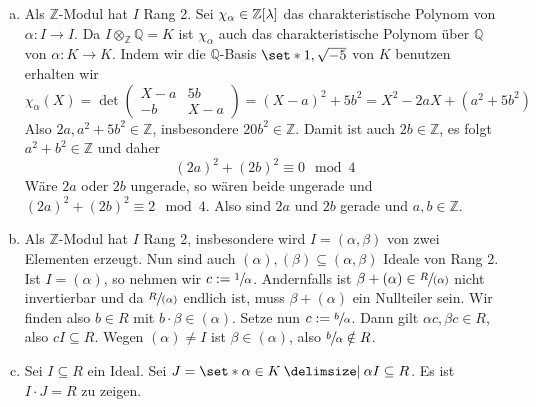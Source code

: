 \begin{beweis}
    \begin{enumerate}[a)]
        \item Als $\mathbb{Z}$-Modul hat $I$ Rang 2.
        Sei $\chi_\alpha \in \mathbb{Z} \benbrace*{\lambda}$ das charakteristische Polynom von $\alpha \colon I \to I$.
        Da $I \otimes_{\mathbb{Z}} \mathbb{Q} = K$ ist $\chi_\alpha$ auch das charakteristische Polynom über $\mathbb{Q}$ von $\alpha \colon K \to K$.
        Indem wir die $\mathbb{Q}$-Basis $\set*{1, \sqrt{-5}}$ von $K$ benutzen erhalten wir 
        \[
            \chi_\alpha(X) = \det \begin{pmatrix}
                X- a & 5b\\
                -b & X-a
            \end{pmatrix} = (X-a)^2 + 5 b^2 = X^2 -2 a X + (a^2 + 5b^2)
        \]
        Also $2a, a^2 + 5b^2 \in \mathbb{Z}$, insbesondere $20b^2 \in \mathbb{Z}$.
        Damit ist auch $2 b \in \mathbb{Z}$, es folgt $a^2 +b^2 \in \mathbb{Z}$ und daher
        \[
            (2a)^2 + (2b)^2 \equiv 0 \mod 4
        \]
        Wäre $2 a$ oder $2b$ ungerade, so wären beide ungerade und $(2a)^2 + (2b)^2 \equiv 2 \mod 4$.
        Also sind $2a$ und $2b$ gerade und $a,b \in \mathbb{Z}$.
        \item Als $\mathbb{Z}$-Modul hat $I$ Rang 2, insbesondere wird $I=(\alpha,\beta)$ von zwei Elementen erzeugt.
        Nun sind auch $(\alpha), (\beta) \subseteq (\alpha,\beta)$ Ideale von Rang 2.
        Ist $I=(\alpha)$, so nehmen wir $c := \sfrac{1}{\alpha}$.
        Andernfalls ist $\beta +(\alpha) \in \sfrac{R}{(\alpha)}$ nicht invertierbar und da $\sfrac{R}{(\alpha)}$ endlich ist, muss $\beta +(\alpha)$ ein Nullteiler sein.
        Wir finden also $b \in R$ mit $b \cdot \beta \in (\alpha)$.
        Setze nun $c := \sfrac{b}{\alpha}$.
        Dann gilt $\alpha c, \beta c \in R$, also $c I \subseteq R$.
        Wegen $(\alpha) \neq I$ ist $\beta \in (\alpha)$, also $\sfrac{b}{\alpha} \notin R$.
        \item Sei $I \subseteq R$ ein Ideal.
        Sei $J = \set*{\alpha \in K \given \alpha I \subseteq R}$.
        Es ist $I \cdot J =R$ zu zeigen.
        

\end{enumerate}
\end{beweis}
